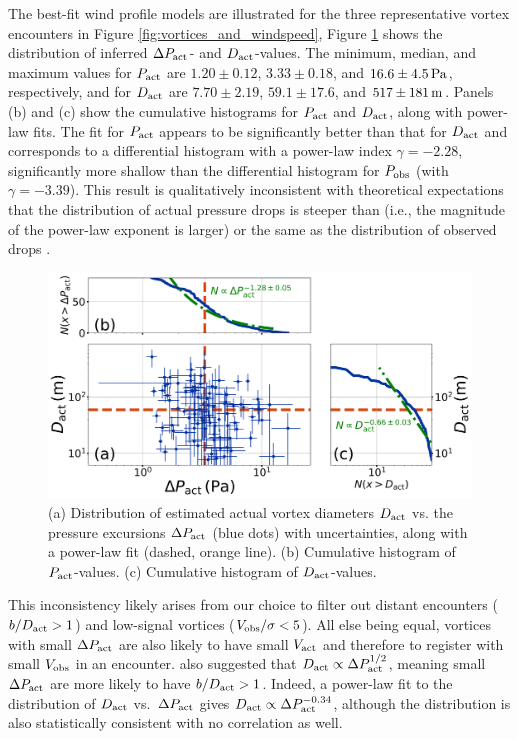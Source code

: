 \documentclass{aastex63}
\begin{document}
The best-fit wind profile models are illustrated for the three representative vortex encounters in Figure \ref{fig:vortices_and_windspeed}, Figure \ref{fig:Dact_vs_Pact} shows the distribution of inferred $\Delta P_{\rm act}$- and $D_{\rm act}$-values. The minimum, median, and maximum values for $P_{\rm act}$ are $1.20\pm0.12$, $3.33\pm0.18$, and $16.6\pm4.5\,{\rm Pa}$, respectively, and for $D_{\rm act}$ are $7.70\pm2.19$, $59.1\pm17.6$, and $517\pm181\,{\rm m}$. Panels (b) and (c) show the cumulative histograms for $P_{\rm act}$ and $D_{\rm act}$, along with power-law fits. The fit for $P_{\rm act}$ appears to be significantly better than that for $D_{\rm act}$ and corresponds to a differential histogram with a power-law index $\gamma = -2.28$, significantly more shallow than the differential histogram for $P_{\rm obs}$ (with $\gamma = -3.39$). This result is qualitatively inconsistent with theoretical expectations that the distribution of actual pressure drops is steeper than (i.e., the magnitude of the power-law exponent is larger) or the same as the distribution of observed drops \citep{2014JAtS...71.4461L, 2018Icar..299..166J, 2019Icar..317..209K}.

\begin{figure}
    \centering
    \includegraphics[width=\textwidth]{figures/Dact_vs_Pact.png}
    \caption{(a) Distribution of estimated actual vortex diameters $D_{\rm act}$ vs. the pressure excursions $\Delta P_{\rm act}$ (blue dots) with uncertainties, along with a power-law fit (dashed, orange line). (b) Cumulative histogram of $P_{\rm act}$-values. (c) Cumulative histogram of $D_{\rm act}$-values.}
    \label{fig:Dact_vs_Pact}
\end{figure}

This inconsistency likely arises from our choice to filter out distant encounters ($b/D_{\rm act} > 1$) and low-signal vortices ($V_{\rm obs}/\sigma < 5$). All else being equal, vortices with small $\Delta P_{\rm act}$ are also likely to have small $V_{\rm act}$ and therefore to register with small $V_{\rm obs}$ in an encounter. \citet{2020Icar..33813523J} also suggested that $D_{\rm act} \propto \Delta P_{\rm act}^{1/2}$, meaning small $\Delta P_{\rm act}$ are more likely to have $b/D_{\rm act} > 1$. Indeed, a power-law fit to the distribution of $D_{\rm act}$ vs.~$\Delta P_{\rm act}$ gives $D_{\rm act} \propto \Delta P_{\rm act}^{-0.34}$, although the distribution is also statistically consistent with no correlation as well. 
\end{document}
